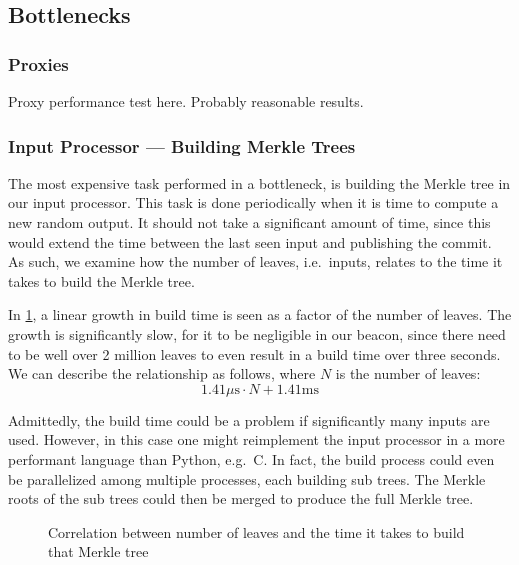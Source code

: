 \subsection{Bottlenecks}%
\label{sub:bottlenecks}

\subsubsection{Proxies}%
\label{ssub:proxies}
Proxy performance test here.
Probably reasonable results.


\subsubsection{Input Processor --- Building Merkle Trees}%
\label{ssub:input_processor_building_merkle_trees}
The most expensive task performed in a bottleneck, is building the Merkle tree in our input processor.
This task is done periodically when it is time to compute a new random output.
It should not take a significant amount of time, since this would extend the time between the last seen input and publishing the commit.
As such, we examine how the number of leaves, i.e.\ inputs, relates to the time it takes to build the Merkle tree.

In \cref{fig:merkle_build}, a linear growth in build time is seen as a factor of the number of leaves.
The growth is significantly slow, for it to be negligible in our beacon, since there need to be well over 2 million leaves to even result in a build time over three seconds.
We can describe the relationship as follows, where $N$ is the number of leaves:
$$
1.41 \mu\text{s} \cdot N + 1.41 \text{ms}
$$

Admittedly, the build time could be a problem if significantly many inputs are used.
However, in this case one might reimplement the input processor in a more performant language than Python, e.g.\ C.
In fact, the build process could even be parallelized among multiple processes, each building sub trees.
The Merkle roots of the sub trees could then be merged to produce the full Merkle tree.

\begin{figure}
    \centering\footnotesize
    \caption{Correlation between number of leaves and the time it takes to build that Merkle tree}%
    \label{fig:merkle_build}
\end{figure}
